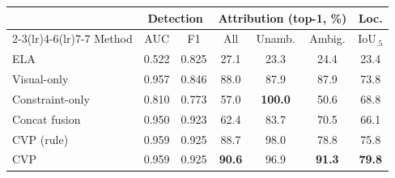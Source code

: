 \begin{tabular}{lcccccc}
\toprule
 & \multicolumn{2}{c}{Detection} & \multicolumn{3}{c}{Attribution (top-1, \%)} & Loc.\\
\cmidrule(lr){2-3}\cmidrule(lr){4-6}\cmidrule(lr){7-7}
Method & AUC & F1 & All & Unamb. & Ambig. & IoU$_{.5}$\\
\midrule
ELA & 0.522 & 0.825 & 27.1 & 23.3 & 24.4 & 23.4\\
Visual-only & 0.957 & 0.846 & 88.0 & 87.9 & 87.9 & 73.8\\
Constraint-only & 0.810 & 0.773 & 57.0 & \textbf{100.0} & 50.6 & 68.8\\
Concat fusion & 0.950 & 0.923 & 62.4 & 83.7 & 70.5 & 66.1\\
CVP (rule) & 0.959 & 0.925 & 88.7 & 98.0 & 78.8 & 75.8\\
CVP & 0.959 & 0.925 & \textbf{90.6} & 96.9 & \textbf{91.3} & \textbf{79.8}\\
\bottomrule
\end{tabular}
